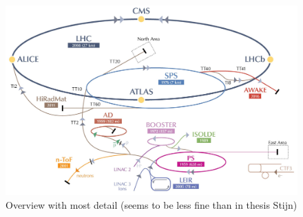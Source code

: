 \begin{figure}[h!t]
 \centering
 \includegraphics[width = 0.99 \textwidth]{Chapters/Chapter2_CERN/Figures/CERNAcceleratorComplex_Detail.jpg}
 \caption{Overview with most detail (seems to be less fine than in thesis Stijn)} \label{fig::LHCChain}
\end{figure}

